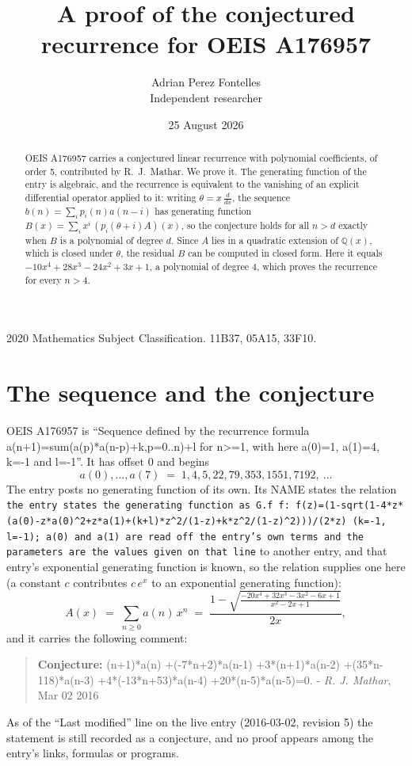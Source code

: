 \documentclass[11pt,a4paper]{article}
\title{A proof of the conjectured recurrence for OEIS A176957}
\author{Adrian Perez Fontelles\\ \small Independent researcher}
\date{25 August 2026}
\theoremstyle{plain}
\theoremstyle{definition}
\begin{document}
\maketitle

\begin{abstract}
OEIS A176957 carries a conjectured linear recurrence with polynomial coefficients, of
order 5, contributed by R.~J.~Mathar. We prove it. The generating function of the
entry is algebraic, and the recurrence is equivalent to the vanishing of an explicit
differential operator applied to it: writing $\theta=x\,\frac{d}{dx}$, the sequence
$b(n)=\sum_{i}p_{i}(n)a(n-i)$ has generating function
$B(x)=\sum_{i}x^{i}\,(p_{i}(\theta+i)A)(x)$, so the conjecture holds for all $n>d$ exactly
when $B$ is a polynomial of degree $d$. Since $A$ lies in a quadratic extension of
$\mathbb{Q}(x)$, which is closed under $\theta$, the residual $B$ can be computed in
closed form. Here it equals $- 10 x^{4} + 28 x^{3} - 24 x^{2} + 3 x + 1$, a polynomial of degree $4$, which proves
the recurrence for every $n>4$.
\end{abstract}

\noindent\small 2020 Mathematics Subject Classification. 11B37, 05A15, 33F10.\normalsize

\section{The sequence and the conjecture}

OEIS A176957 is ``Sequence defined by the recurrence formula a(n+1)=sum(a(p)*a(n-p)+k,p=0..n)+l for n>=1, with here a(0)=1, a(1)=4, k=-1 and l=-1''. It has offset $0$ and begins
\[
a(0),\dots,a(7)\;=\;1, 4, 5, 22, 79, 353, 1551, 7192,\ \dots
\]
The entry posts no generating function of its own. Its NAME states the
relation \texttt{the entry states the generating function as G.f f: f(z)=(1-sqrt(1-4*z*(a(0)-z*a(0)\textasciicircum{}2+z*a(1)+(k+l)*z\textasciicircum{}2/(1-z)+k*z\textasciicircum{}2/(1-z)\textasciicircum{}2)))/(2*z) (k=-1, l=-1); a(0) and a(1) are read off the entry's own terms and the parameters are the values given on that line} to another entry, and that entry's exponential generating
function is known, so the relation supplies one here (a constant $c$ contributes
$c\,e^{x}$ to an exponential generating function):
\begin{equation}\label{eq:gf}
A(x)\;=\;\sum_{n\ge 0} a(n)\,x^{n}\;=\;\frac{1 - \sqrt{\frac{- 20 x^{4} + 32 x^{3} - 3 x^{2} - 6 x + 1}{x^{2} - 2 x + 1}}}{2 x} ,
\end{equation}
and it carries the following comment:
\begin{quote}\small
\textbf{Conjecture:} (n+1)*a(n) +(-7*n+2)*a(n-1) +3*(n+1)*a(n-2) +(35*n-118)*a(n-3) +4*(-13*n+53)*a(n-4) +20*(n-5)*a(n-5)=0. - \emph{R. J. Mathar}, Mar 02 2016
\end{quote}
As of the ``Last modified'' line on the live entry (2016-03-02, revision 5) the
statement is still recorded as a conjecture, and no proof appears among the entry's links,
formulas or programs.
\end{document}
